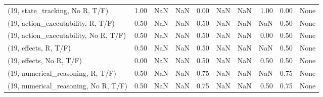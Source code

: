 \begin{table*}[h!]
\begin{adjustbox}{width=2\columnwidth,center}
\begin{tabular}{lrrr|rrr|rrr}
(19, state\_tracking, No R, T/F)       &                      1.00 &                   NaN &                       NaN &                          0.00 &                       NaN &                           NaN &                                   1.00 &                               0.00 &                                  None \\
(19, action\_executability, R, T/F)    &                      0.50 &                   NaN &                       NaN &                          0.50 &                       NaN &                           NaN &                                    NaN &                               0.50 &                                  None \\
(19, action\_executability, No R, T/F) &                      0.50 &                   NaN &                       NaN &                          0.50 &                       NaN &                           NaN &                                   0.00 &                               0.50 &                                  None \\
(19, effects, R, T/F)                 &                      0.50 &                   NaN &                       NaN &                          0.50 &                       NaN &                           NaN &                                    NaN &                               0.50 &                                  None \\
(19, effects, No R, T/F)              &                      0.00 &                   NaN &                       NaN &                          0.50 &                       NaN &                           NaN &                                   0.50 &                               0.50 &                                  None \\
(19, numerical\_reasoning, R, T/F)     &                      0.50 &                   NaN &                       NaN &                          0.75 &                       NaN &                           NaN &                                    NaN &                               0.75 &                                  None \\
(19, numerical\_reasoning, No R, T/F)  &                      0.50 &                   NaN &                       NaN &                          0.75 &                       NaN &                           NaN &                                   0.50 &                               0.75 &                                  None \\

\end{tabular}
\end{adjustbox}
\end{table*}
